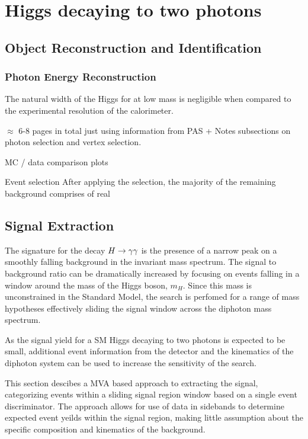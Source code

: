 \chapter{Higgs decaying to two photons}


\section{Object Reconstruction and Identification}

\subsection{Photon Energy Reconstruction}

The natural width of the Higgs for at low mass is negligible when compared to the experimental 
resolution of the calorimeter. 

$\approx$ 6-8 pages in total just using information from PAS + Notes
subsections on photon selection and vertex selection.

MC / data comparison plots

Event selection
After applying the selection, the majority of the remaining background comprises of real 


\section{Signal Extraction}

The signature for the decay $H\rightarrow\gamma\gamma$ is the presence of a narrow peak on a smoothly falling background in 
the invariant mass spectrum. 
The signal to background ratio can be dramatically increased by focusing on events falling in a window 
around the mass of the Higgs boson, $m_{H}$. Since this mass is unconstrained in the Standard Model, 
the search is perfomed for a range of mass hypotheses effectively sliding the signal window across 
the diphoton mass spectrum.

As the signal yield for a SM Higgs decaying to two photons is expected to be small, 
additional event information from the detector and the kinematics of the diphoton system can be used to 
increase the sensitivity of the search. 

This section descibes a MVA based approach to extracting the signal, categorizing events within a sliding 
signal region window based on a single event discriminator. The approach allows for use of data in sidebands
to determine expected event yeilds within the signal region, making little assumption about the specific
composition and kinematics of the background. 

